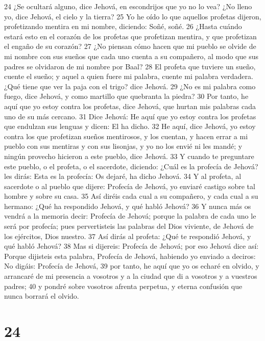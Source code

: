 24 ¿Se ocultará alguno, dice Jehová, en escondrijos que yo no lo vea? ¿No lleno yo, dice Jehová, el cielo y la tierra?
25 Yo he oído lo que aquellos profetas dijeron, profetizando mentira en mi nombre, diciendo: Soñé, soñé.
26 ¿Hasta cuándo estará esto en el corazón de los profetas que profetizan mentira, y que profetizan el engaño de su corazón?
27 ¿No piensan cómo hacen que mi pueblo se olvide de mi nombre con sus sueños que cada uno cuenta a su compañero, al modo que sus padres se olvidaron de mi nombre por Baal?
28 El profeta que tuviere un sueño, cuente el sueño; y aquel a quien fuere mi palabra, cuente mi palabra verdadera. ¿Qué tiene que ver la paja con el trigo? dice Jehová.
29 ¿No es mi palabra como fuego, dice Jehová, y como martillo que quebranta la piedra?
30 Por tanto, he aquí que yo estoy contra los profetas, dice Jehová, que hurtan mis palabras cada uno de su más cercano.
31 Dice Jehová: He aquí que yo estoy contra los profetas que endulzan sus lenguas y dicen: El ha dicho.
32 He aquí, dice Jehová, yo estoy contra los que profetizan sueños mentirosos, y los cuentan, y hacen errar a mi pueblo con sus mentiras y con sus lisonjas, y yo no los envié ni les mandé; y ningún provecho hicieron a este pueblo, dice Jehová.
33 Y cuando te preguntare este pueblo, o el profeta, o el sacerdote, diciendo: ¿Cuál es la profecía de Jehová? les dirás: Esta es la profecía: Os dejaré, ha dicho Jehová.
34 Y al profeta, al sacerdote o al pueblo que dijere: Profecía de Jehová, yo enviaré castigo sobre tal hombre y sobre su casa.
35 Así diréis cada cual a su compañero, y cada cual a su hermano: ¿Qué ha respondido Jehová, y qué habló Jehová?
36 Y nunca más os vendrá a la memoria decir: Profecía de Jehová; porque la palabra de cada uno le será por profecía; pues pervertisteis las palabras del Dios viviente, de Jehová de los ejércitos, Dios nuestro.
37 Así dirás al profeta: ¿Qué te respondió Jehová, y qué habló Jehová?
38 Mas si dijereis: Profecía de Jehová; por eso Jehová dice así: Porque dijisteis esta palabra, Profecía de Jehová, habiendo yo enviado a deciros: No digáis: Profecía de Jehová,
39 por tanto, he aquí que yo os echaré en olvido, y arrancaré de mi presencia a vosotros y a la ciudad que di a vosotros y a vuestros padres;
40 y pondré sobre vosotros afrenta perpetua, y eterna confusión que nunca borrará el olvido.

\chapter{24}

